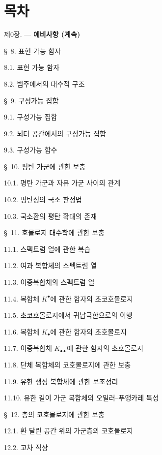 \clearpage
{}

\section*{목차}

\begin{flushleft}
\textsc{제0장.} --- \textbf{예비사항 (계속)} 

\medskip
\S~8. 표현 가능 함자 

8.1. 표현 가능 함자 

8.2. 범주에서의 대수적 구조 

\medskip
\S~9. 구성가능 집합 

9.1. 구성가능 집합 

9.2. 뇌터 공간에서의 구성가능 집합 

9.3. 구성가능 함수 

\medskip
\S~10. 평탄 가군에 관한 보충 

10.1. 평탄 가군과 자유 가군 사이의 관계 

10.2. 평탄성의 국소 판정법 

10.3. 국소환의 평탄 확대의 존재 

\medskip
\S~11. 호몰로지 대수학에 관한 보충 

11.1. 스펙트럼 열에 관한 복습 

11.2. 여과 복합체의 스펙트럼 열 

11.3. 이중복합체의 스펙트럼 열 

11.4. 복합체 $K^\bullet$에 관한 함자의 초코호몰로지

11.5. 초코호몰로지에서 귀납극한으로의 이행 

11.6. 복합체 $K_\bullet$에 관한 함자의 초호몰로지

11.7. 이중복합체 $K_{\bullet\bullet}$에 관한 함자의 초호몰로지

11.8. 단체 복합체의 코호몰로지에 관한 보충 

11.9. 유한 생성 복합체에 관한 보조정리 

11.10. 유한 길이 가군 복합체의 오일러--푸앵카레 특성

\medskip
\S~12. 층의 코호몰로지에 관한 보충 

12.1. 환 달린 공간 위의 가군층의 코호몰로지 

12.2. 고차 직상 


\end{flushleft}
